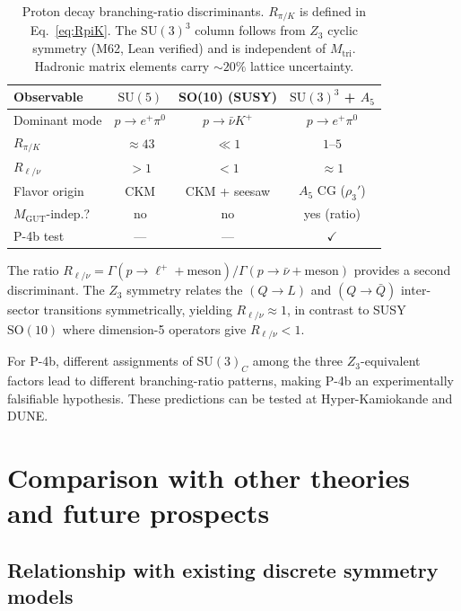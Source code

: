 \documentclass[sn-mathphys-num,Numbered]{sn-jnl}
\theoremstyle{thmstyleone}
\theoremstyle{thmstylethree}
\newcommand{\SU}{\mathrm{SU}}
\newcommand{\SO}{\mathrm{SO}}
\begin{document}
\begin{table}[t]
\centering
\caption{Proton decay branching-ratio discriminants.
$R_{\pi/K}$ is defined in Eq.~\eqref{eq:RpiK}.
The $\SU(3)^3$ column follows from $Z_3$ cyclic symmetry
(M62, Lean verified) and is independent of $M_{\mathrm{tri}}$.
Hadronic matrix elements carry $\sim 20\%$ lattice uncertainty.}
\label{tab:proton_decay}
\begin{tabular}{lccc}
\toprule
Observable & $\SU(5)$ & SO(10) (SUSY) & $\SU(3)^3$ + $A_5$ \\
\midrule
Dominant mode & $p \to e^+\pi^0$ & $p \to \bar\nu K^+$ & $p \to e^+\pi^0$ \\
$R_{\pi/K}$ & $\approx 43$ & $\ll 1$ & $1$--$5$ \\[2pt]
$R_{\ell/\nu}$ & $> 1$ & $< 1$ & $\approx 1$ \\
Flavor origin & CKM & CKM + seesaw & $A_5$ CG ($\rho_3'$) \\
$M_{\mathrm{GUT}}$-indep.? & no & no & yes (ratio) \\
P-4b test & --- & --- & $\checkmark$ \\
\bottomrule
\end{tabular}
\end{table}

The ratio $R_{\ell/\nu} = \Gamma(p \to \ell^+ + \text{meson})
/ \Gamma(p \to \bar\nu + \text{meson})$ provides a second discriminant.
The $Z_3$ symmetry relates the $(Q \to L)$ and $(Q \to \bar{Q})$
inter-sector transitions symmetrically, yielding $R_{\ell/\nu} \approx 1$,
in contrast to SUSY~$\SO(10)$ where dimension-5 operators give
$R_{\ell/\nu} < 1$.

For P-4b, different assignments of $\SU(3)_C$ among the three
$Z_3$-equivalent factors lead to different branching-ratio patterns,
making P-4b an experimentally falsifiable hypothesis.
These predictions can be tested at Hyper-Kamiokande and DUNE.


\section{Comparison with other theories and future
  prospects}\label{sec:comparison}


\subsection{Relationship with existing discrete symmetry models}\label{sec:discrete}
\end{document}
